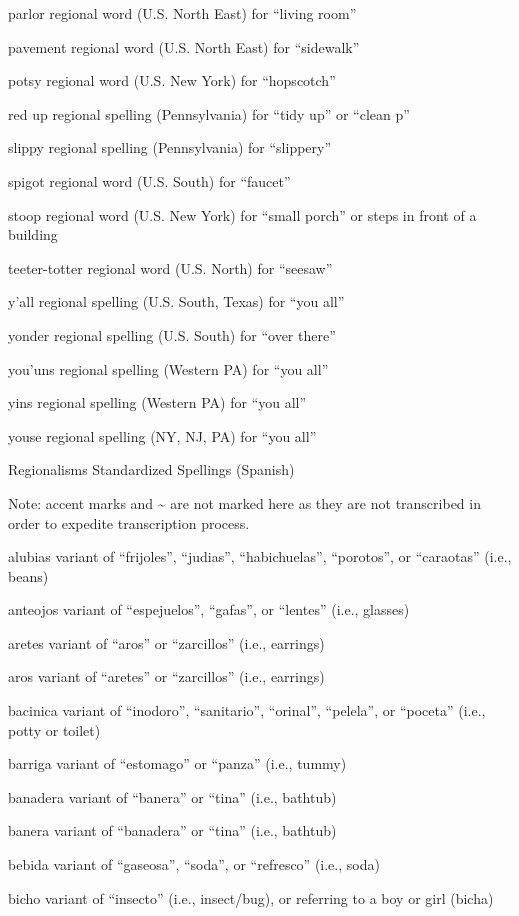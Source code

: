 \documentclass[
  12pt,
]{book}
\begin{document}
parlor
regional word (U.S. North East) for ``living room''

pavement
regional word (U.S. North East) for ``sidewalk''

potsy
regional word (U.S. New York) for ``hopscotch''

red up
regional spelling (Pennsylvania) for ``tidy up'' or ``clean p''

slippy
regional spelling (Pennsylvania) for ``slippery''

spigot
regional word (U.S. South) for ``faucet''

stoop
regional word (U.S. New York) for ``small porch'' or steps in front of a building

teeter-totter
regional word (U.S. North) for ``seesaw''

y'all
regional spelling (U.S. South, Texas) for ``you all''

yonder
regional spelling (U.S. South) for ``over there''

you'uns
regional spelling (Western PA) for ``you all''

yins
regional spelling (Western PA) for ``you all''

youse
regional spelling (NY, NJ, PA) for ``you all''

Regionalisms Standardized Spellings (Spanish)

Note: accent marks and \textasciitilde{} are not marked here as they are not transcribed in order to expedite transcription process.

alubias
variant of ``frijoles'', ``judias'', ``habichuelas'', ``porotos'', or ``caraotas'' (i.e., beans)

anteojos
variant of ``espejuelos'', ``gafas'', or ``lentes'' (i.e., glasses)

aretes
variant of ``aros'' or ``zarcillos'' (i.e., earrings)

aros
variant of ``aretes'' or ``zarcillos'' (i.e., earrings)

bacinica
variant of ``inodoro'', ``sanitario'', ``orinal'', ``pelela'', or ``poceta'' (i.e., potty or toilet)

barriga
variant of ``estomago'' or ``panza'' (i.e., tummy)

banadera
variant of ``banera'' or ``tina'' (i.e., bathtub)

banera
variant of ``banadera'' or ``tina'' (i.e., bathtub)

bebida
variant of ``gaseosa'', ``soda'', or ``refresco'' (i.e., soda)

bicho
variant of ``insecto'' (i.e., insect/bug), or referring to a boy or girl (bicha)
\end{document}
